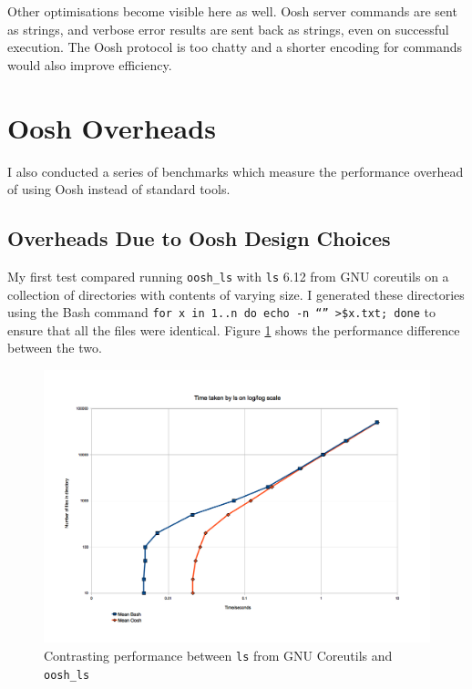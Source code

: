 \documentclass[12pt,twoside,notitlepage]{report}
\begin{document}
Other optimisations become visible here as well. Oosh server commands
are sent as strings, and verbose error results are sent back as
strings, even on successful execution. The Oosh protocol is too chatty and a
shorter encoding for commands would also improve efficiency.






\section{Oosh Overheads}
I also conducted a series of benchmarks which measure the performance
overhead of using Oosh instead of standard tools.

\subsection{Overheads Due to Oosh Design Choices}
My first test compared running {\tt oosh\_ls} with {\tt ls} 6.12 from
GNU coreutils on a collection of directories with contents of varying
size. I generated these directories using the Bash command {\tt for x
  in {1..n} do echo -n ``'' >\$x.txt; done} to ensure that all the
files were identical. Figure \ref{lsspeed} shows the performance
difference between the two.

\begin{figure}[h]
\centering
\includegraphics[scale=0.5]{ls_graph.png}
\caption{Contrasting performance between {\tt ls} from GNU Coreutils
  and {\tt oosh\_ls}}
\label{lsspeed}
\end{figure}
\end{document}
